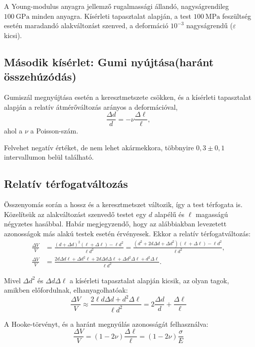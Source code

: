 \documentclass[a4paper, 12pt]{article}
\begin{document}
A Young-modulus anyagra jellemző rugalmassági állandó, nagyságrendileg $100~ \mathrm{GPa}$ minden anyagra. Kísérleti tapasztalat alapján, a test $100~\mathrm{MPa}$ feszültség esetén maradandó alakváltozást szenved, a deformáció $10^{-3}$ nagyságrendű ($\varepsilon$ kicsi).

\subsection*{Második kísérlet: Gumi nyújtása(haránt összehúzódás)}
Gumiszál megnyújtása esetén a keresztmetszete csökken, és a kísérleti tapasztalat alapján a relatív átmérőváltozás arányos a deformációval,            
\begin{equation*}
\frac{\Delta d}{d}=-\nu\frac{\Delta\ell}{\ell},
\end{equation*}
ahol a $\nu$ a Poisson-szám.

Felvehet negatív értéket, de nem lehet akármekkora, többnyire $0{,}3\pm 0{,}1$ intervallumon belül található.

\subsection*{Relatív térfogatváltozás}
Összenyomás során a hossz és a keresztmetszet változik, így a test térfogata is. Közelítsük az alakváltozást szenvedő testet egy $d$ alapélű és $\ell$ magasságú négyzetes hasábbal. Habár megjegyzendő, hogy az alábbiakban levezetett azonosságok más alakú testek esetén érvényesek. Ekkor a relatív térfogatváltozás:
\begin{align*}
\frac{\Delta V}{V} & =\frac{(d+\Delta d)^2(\ell+\Delta\ell)-\ell d^2}{\ell d^2}=\frac{(d^2+2d\Delta d+\Delta d^2)(\ell+\Delta\ell)-\ell d^2}{\ell d^2},\\
\frac{\Delta V}{V} & =\frac{2d\Delta d\ell+\Delta d^2\ell+2d\Delta d\Delta\ell+\Delta d^2\Delta\ell+d^2\Delta\ell}{\ell d^2}.
\end{align*}

Mivel $\Delta d^2$ és $\Delta d\Delta\ell$ a kísérleti tapasztalat alapján kicsik, az olyan tagok, amikben előfordulnak, elhanyagolhatóak:
\begin{equation*}
\frac{\Delta V}{V}\approx \frac{2\ell d\Delta d+d^2\Delta\ell}{\ell d^2}=2\frac{\Delta d}{d}+\frac{\Delta\ell}{\ell}
\end{equation*}

A Hooke-törvényt, és a haránt megnyúlás azonosságát felhasználva:
\begin{equation*}
\frac{\Delta V}{V}=(1-2\nu)\frac{\Delta\ell}{\ell}=(1-2\nu)\frac{\sigma}{E}
\end{equation*}
\end{document}
